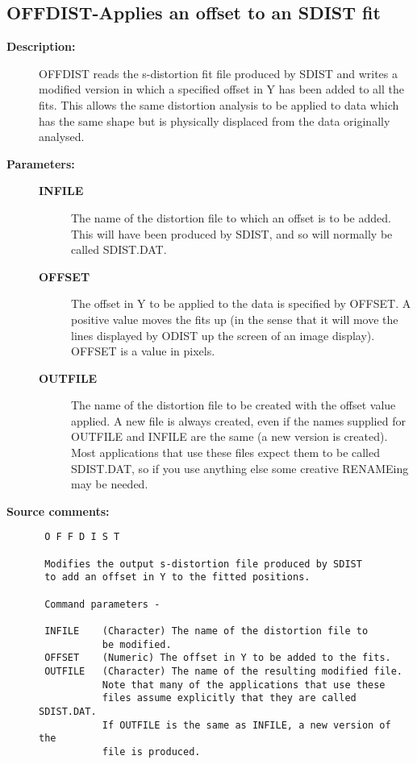 \subsection{OFFDIST-\label{OFFDIST}Applies an offset to an SDIST fit}
\begin{description}

\item [{\bf Description:}]
 OFFDIST reads the s-distortion fit file produced by SDIST and
 writes a modified version in which a specified offset in Y has
 been added to all the fits.  This allows the same distortion
 analysis to be applied to data which has the same shape but is
 physically displaced from the data originally analysed.

\item [{\bf Parameters:}]
\begin{description}
\item [{\bf INFILE}]
 The name of the distortion file to
 which an offset is to be added.  This will have been
 produced by SDIST, and so will normally be called
 SDIST.DAT.
\item [{\bf OFFSET}]
 The offset in Y to be applied to the data is specified
 by OFFSET.  A positive value moves the fits up (in the
 sense that it will move the lines displayed by ODIST
 up the screen of an image display).  OFFSET is a value
 in pixels.
\item [{\bf OUTFILE}]
 The name of the distortion file to be created with
 the offset value applied.  A new file is always
 created, even if the names supplied for OUTFILE and
 INFILE are the same (a new version is created).  Most
 applications that use these files expect them to be
 called SDIST.DAT, so if you use anything else some
 creative RENAMEing may be needed.
\end{description}

\item [{\bf Source comments:}]
\begin{verbatim}
 O F F D I S T

 Modifies the output s-distortion file produced by SDIST
 to add an offset in Y to the fitted positions.

 Command parameters -

 INFILE    (Character) The name of the distortion file to
           be modified.
 OFFSET    (Numeric) The offset in Y to be added to the fits.
 OUTFILE   (Character) The name of the resulting modified file.
           Note that many of the applications that use these
           files assume explicitly that they are called SDIST.DAT.
           If OUTFILE is the same as INFILE, a new version of the
           file is produced.


\end{verbatim}
\end{description}
